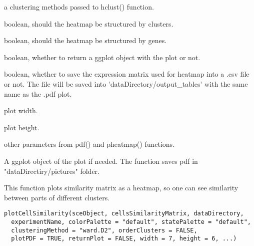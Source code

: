 \documentclass[a4paper]{book}
\begin{document}
\begin{Arguments}
\begin{ldescription}
\item[\code{clusteringMethod}] a clustering methods passed to hclust() function.

\item[\code{orderClusters}] boolean, should the heatmap be structured by clusters.

\item[\code{orderGenes}] boolean, should the heatmap be structured by genes.

\item[\code{returnPlot}] boolean, whether to return a ggplot object with the plot or not.

\item[\code{saveHeatmapTable}] boolean, whether to save the expression matrix used for heatmap into a .csv file or not.
The file will be saved into 'dataDirectory/output\_tables' with the same name as the .pdf plot.

\item[\code{width}] plot width.

\item[\code{height}] plot height.

\item[\code{...}] other parameters from pdf() and pheatmap() functions.
\end{ldescription}
\end{Arguments}
%
\begin{Value}
A ggplot object of the plot if needed. The function saves pdf in "dataDirectiry/pictures" folder.
\end{Value}
%
\begin{Description}\relax
This function plots similarity matrix as a heatmap, so one can see similarity between parts of different clusters.
\end{Description}
%
\begin{Usage}
\begin{verbatim}
plotCellSimilarity(sceObject, cellsSimilarityMatrix, dataDirectory,
  experimentName, colorPalette = "default", statePalette = "default",
  clusteringMethod = "ward.D2", orderClusters = FALSE,
  plotPDF = TRUE, returnPlot = FALSE, width = 7, height = 6, ...)
\end{verbatim}
\end{Usage}
%
\end{document}
